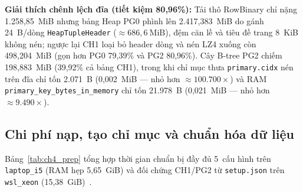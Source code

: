 \documentclass[13pt,a4paper]{report}
\begin{document}
\begin{table}[!htb]
\centering
\footnotesize
\caption{Dung lượng dữ liệu và chỉ mục trên đĩa của 5 cấu hình (30M dòng trên \texttt{laptop\_i5}, đơn vị MiB~\cite{S6, P10})}
\label{tab:ch4_disk_size}
\end{table}

\noindent\textbf{Giải thích chênh lệch đĩa (tiết kiệm 80,96\%):} Tải thô RowBinary chỉ nặng 1.258,85~MiB nhưng bảng Heap PG0 phình lên 2.417,383~MiB do gánh 24~B/dòng \texttt{HeapTupleHeader} ($\approx 686{,}6~\text{MiB}$), đệm căn lề và tiêu đề trang 8~KiB không nén; ngược lại CH1 loại bỏ header dòng và nén LZ4 xuống còn 498,204~MiB (gọn hơn PG0 79,39\% và PG2 80,96\%). Cây B-tree PG2 chiếm 198,883~MiB (39,92\% cả bảng CH1), trong khi chỉ mục thưa \texttt{primary.\allowbreak{}cidx} nén trên đĩa chỉ tốn 2.071~B (0,002~MiB --- nhỏ hơn $\approx 100.700{\times}$) và RAM \texttt{primary\_\allowbreak{}key\_\allowbreak{}bytes\_\allowbreak{}in\_\allowbreak{}memory} chỉ tốn 21.978~B (0,021~MiB --- nhỏ hơn $\approx 9.490{\times}$).

\subsection{Chi phí nạp, tạo chỉ mục và chuẩn hóa dữ liệu}
Bảng~\ref{tab:ch4_prep} tổng hợp thời gian chuẩn bị đầy đủ 5~cấu hình trên \texttt{laptop\_\allowbreak{}i5} (RAM hẹp 5,65~GiB) và đối chứng CH1/PG2 từ \texttt{setup.json} trên \texttt{wsl\_\allowbreak{}xeon} (15,38~GiB)~\cite{S19, P8}.
\end{document}
